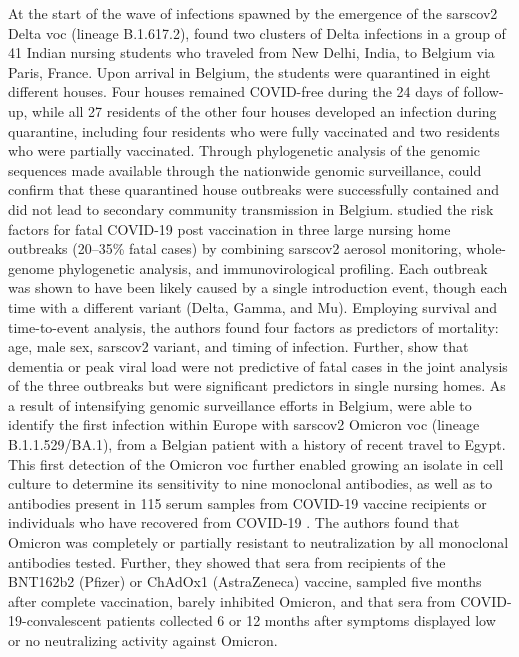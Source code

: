 At the start of the wave of infections spawned by the emergence of the \gls{sarscov2} Delta \gls{voc} (lineage B.1.617.2), \citet{vanelslande2022two} found two clusters of Delta infections in a group of 41 Indian nursing students who traveled from New Delhi, India, to Belgium via Paris, France.
Upon arrival in Belgium, the students were quarantined in eight different houses.
Four houses remained COVID-free during the 24 days of follow-up, while all 27 residents of the other four houses developed an infection during quarantine, including four residents who were fully vaccinated and two residents who were partially vaccinated.
Through phylogenetic analysis of the genomic sequences made available through the nationwide genomic surveillance, \citet{vanelslande2022two} could confirm that these quarantined house outbreaks were successfully contained and did not lead to secondary community transmission in Belgium.
\citet{cuypers2022comprehensive} studied the risk factors for fatal COVID-19 post vaccination in three large nursing home outbreaks (20--35\% fatal cases) by combining \gls{sarscov2} aerosol monitoring, whole-genome phylogenetic analysis, and immunovirological profiling.
Each outbreak was shown to have been likely caused by a single introduction event, though each time with a different variant (Delta, Gamma, and Mu).
Employing survival and time-to-event analysis, the authors found four factors as predictors of mortality: age, male sex, \gls{sarscov2} variant, and timing of infection.
Further, \citet{cuypers2022comprehensive} show that dementia or peak viral load were not predictive of fatal cases in the joint analysis of the three outbreaks but were significant predictors in single nursing homes.
As a result of intensifying genomic surveillance efforts in Belgium, \citet{vanmechelen2022identification} were able to identify the first infection within Europe with \gls{sarscov2} Omicron \gls{voc} (lineage B.1.1.529/BA.1), from a Belgian patient with a history of recent travel to Egypt.
This first detection of the Omicron \gls{voc} further enabled growing an isolate in cell culture to determine its sensitivity to nine monoclonal antibodies, as well as to antibodies present in 115 serum samples from COVID-19 vaccine recipients or individuals who have recovered from COVID-19 \citep{planas2022considerable}.
The authors found that Omicron was completely or partially resistant to neutralization by all monoclonal antibodies tested.
Further, they showed that sera from recipients of the BNT162b2 (Pfizer) or ChAdOx1 (AstraZeneca) vaccine, sampled five months after complete vaccination, barely inhibited Omicron, and that sera from COVID-19-convalescent patients collected 6 or 12 months after symptoms displayed low or no neutralizing activity against Omicron.
